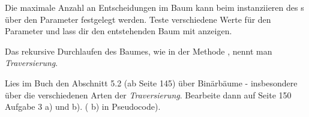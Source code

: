 \documentclass[10pt, a4paper]{scrartcl}
\begin{document}
\begin{aufgabe}
	Die maximale Anzahl an Entscheidungen im Baum kann beim instanziieren des s über den Parameter  festgelegt werden. Teste verschiedene Werte für den Parameter und lass dir den entstehenden Baum mit  anzeigen.
\end{aufgabe}

\begin{aufgabe}
	Das rekursive Durchlaufen des Baumes, wie in der Methode , nennt man \emph{Traversierung}.
	
	Lies im Buch den Abschnitt 5.2 (ab Seite 145) über Binärbäume - insbesondere über die verschiedenen Arten der \emph{Traversierung}. Bearbeite dann auf Seite 150 Aufgabe 3 a) und b). ( b) in Pseudocode).
\end{aufgabe}
\end{document}
